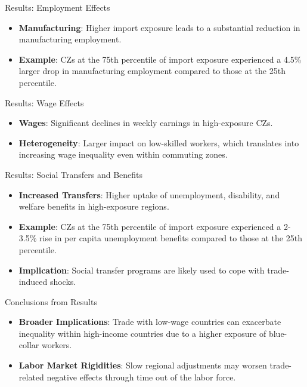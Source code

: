 \documentclass{beamer}
\begin{document}
\begin{frame}{Results: Employment Effects}
    \begin{itemize}
        \item \textbf{Manufacturing}: Higher import exposure leads to a substantial reduction in manufacturing employment.
        \item \textbf{Example}: CZs at the 75th percentile of import exposure experienced a 4.5\% larger drop in manufacturing employment compared to those at the 25th percentile.
    \end{itemize}
\end{frame}

\begin{frame}{Results: Wage Effects}
    \begin{itemize}
        \item \textbf{Wages}: Significant declines in weekly earnings in high-exposure CZs.
        \item \textbf{Heterogeneity}: Larger impact on low-skilled workers, which translates into increasing wage inequality even within commuting zones.
    \end{itemize}
\end{frame}

\begin{frame}{Results: Social Transfers and Benefits}
    \begin{itemize}
        \item \textbf{Increased Transfers}: Higher uptake of unemployment, disability, and welfare benefits in high-exposure regions.
        \item \textbf{Example}: CZs at the 75th percentile of import exposure experienced a 2-3.5\% rise in per capita unemployment benefits compared to those at the 25th percentile.
        \item \textbf{Implication}: Social transfer programs are likely used to cope with trade-induced shocks.
    \end{itemize}
\end{frame}


\begin{frame}{Conclusions from Results}
    \begin{itemize}
        \item \textbf{Broader Implications}: Trade with low-wage countries can exacerbate inequality within high-income countries due to a higher exposure of blue-collar workers.
        \item \textbf{Labor Market Rigidities}: Slow regional adjustments may worsen trade-related negative effects through time out of the labor force.
    \end{itemize}
\end{frame}
\end{document}
